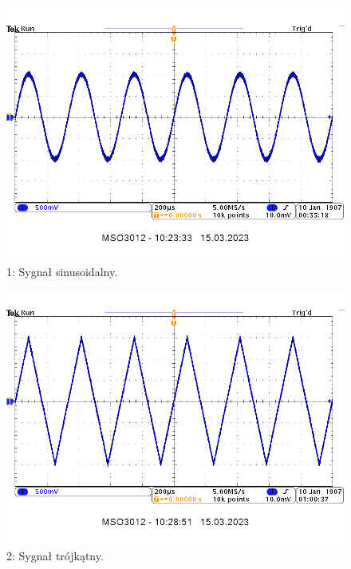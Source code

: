 \documentclass[14pt, table]{extarticle}
\begin{document}
\begin{figure}[H]
\includegraphics[scale=0.7]{A18}
\centering
\captionsetup{labelformat=empty}
\caption{1: Sygnał sinusoidalny.}
\end{figure}

\begin{figure}[H]
\includegraphics[scale=0.7]{A20}
\centering
\captionsetup{labelformat=empty}
\caption{2: Sygnał trójkątny.}
\end{figure}
\end{document}

